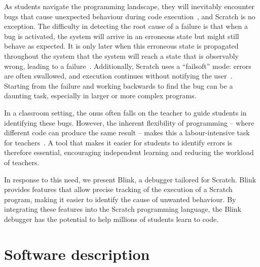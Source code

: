 \documentclass[../main]{subfiles}
\begin{document}
As students navigate the programming landscape, they will inevitably encounter bugs that cause unexpected behaviour during code execution~\autocite{zellerWhyProgramsFail2009}, and Scratch is no exception.
The difficulty in detecting the root cause of a failure is that when a bug is activated, the system will arrive in an erroneous state but might still behave as expected.
It is only later when this erroneous state is propagated throughout the system that the system will reach a state that is observably wrong, leading to a failure~\autocite{ammannIntroductionSoftwareTesting2016}.
Additionally, Scratch uses a ``failsoft'' mode: errors are often swallowed, and execution continues without notifying the user~\autocite{hromkovicProblemDebuggingCurrent2021}.
Starting from the failure and working backwards to find the bug can be a daunting task, especially in larger or more complex programs.

In a classroom setting, the onus often falls on the teacher to guide students in identifying these bugs.
However, the inherent flexibility of programming -- where different code can produce the same result -- makes this a labour-intensive task for teachers~\autocite{kimDebuggingBlockbasedProgramming2018}.
A tool that makes it easier for students to identify errors is therefore essential, encouraging independent learning and reducing the workload of teachers.

In response to this need, we present Blink, a debugger tailored for Scratch.
Blink provides features that allow precise tracking of the execution of a Scratch program, making it easier to identify the cause of unwanted behaviour.
By integrating these features into the Scratch programming language, the Blink debugger has the potential to help millions of students learn to code.

\section{Software description}\label{sec:blink-software-description}
\end{document}
